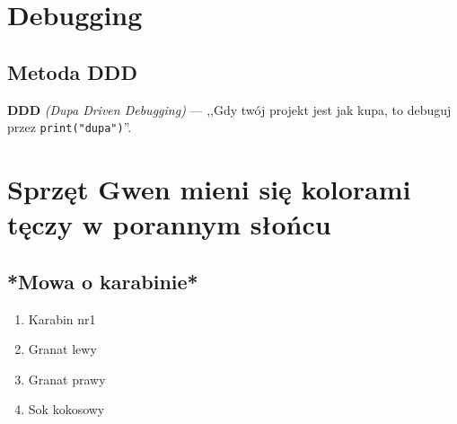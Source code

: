 \chapter{Debugging}
\section{Metoda DDD}

\textbf{DDD} \textsl{(Dupa Driven Debugging)} --- ,,Gdy twój projekt jest jak kupa, to debuguj przez \verb|print("dupa")|''.
\chapter{Sprzęt Gwen mieni się kolorami tęczy w porannym słońcu}
\section{*Mowa o karabinie*}

\begin{enumerate}
    \item Karabin nr1
    \item Granat lewy
    \item Granat prawy
    \item Sok kokosowy
\end{enumerate}
